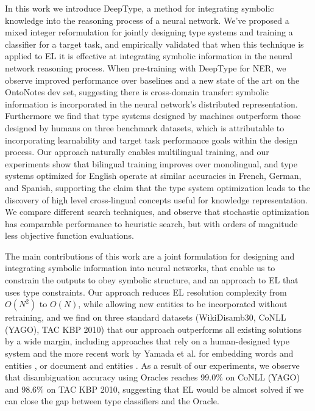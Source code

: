 \documentclass[letterpaper]{article}
\begin{document}
In this work we introduce DeepType, a method for integrating symbolic knowledge into the reasoning process of a neural network. We've proposed a mixed integer reformulation for jointly designing type systems and training a classifier for a target task, and empirically validated that when this technique is applied to EL it is effective at integrating symbolic information in the neural network reasoning process.
When pre-training with DeepType for NER, we observe improved performance over baselines and a new state of the art on the OntoNotes dev set, suggesting there is cross-domain transfer: symbolic information is incorporated in the neural network's distributed representation.
Furthermore we find that type systems designed by machines outperform those designed by humans on three benchmark datasets, which is attributable to incorporating learnability and target task performance goals within the design process.
Our approach naturally enables multilingual training, and our experiments show that bilingual training improves over monolingual, and type systems optimized for English operate at similar accuracies in French, German, and Spanish, supporting the claim that the type system optimization leads to the discovery of high level cross-lingual concepts useful for knowledge representation.
We compare different search techniques, and observe that stochastic optimization has comparable performance to heuristic search, but with orders of magnitude less objective function evaluations.

The main contributions of this work are a joint formulation for designing and integrating symbolic information into neural networks, that enable us to constrain the outputs to obey symbolic structure, and an approach to EL that uses type constraints. Our approach reduces EL resolution complexity from $O(N^2)$ to $O(N)$, while allowing new entities to be incorporated without retraining, and we find on three standard datasets (WikiDisamb30, CoNLL (YAGO), TAC KBP 2010) that our approach outperforms all existing solutions by a wide margin, including approaches that rely on a human-designed type system \cite{ling2015design} and the more recent work by Yamada et al. for embedding words and entities \cite{yamada2016joint}, or document and entities \cite{yamada2017learning}. As a result of our experiments, we observe that disambiguation accuracy using Oracles reaches 99.0\% on CoNLL (YAGO) and 98.6\% on TAC KBP 2010, suggesting that EL would be almost solved if we can close the gap between type classifiers and the Oracle.
\end{document}
